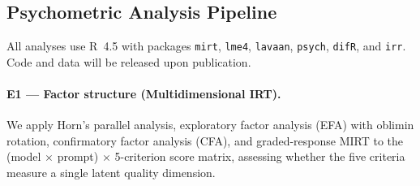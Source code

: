 \documentclass[10pt]{article}
\begin{document}
\subsection{Psychometric Analysis Pipeline}
All analyses use R~4.5 with packages \texttt{mirt}, \texttt{lme4},
\texttt{lavaan}, \texttt{psych}, \texttt{difR}, and \texttt{irr}.
Code and data will be released upon publication.

\paragraph{E1 — Factor structure (Multidimensional IRT).}
We apply Horn's parallel analysis, exploratory factor analysis (EFA) with
oblimin rotation, confirmatory factor analysis (CFA), and graded-response
MIRT to the (model $\times$ prompt) $\times$ 5-criterion score matrix,
assessing whether the five criteria measure a single latent quality dimension.
\end{document}
